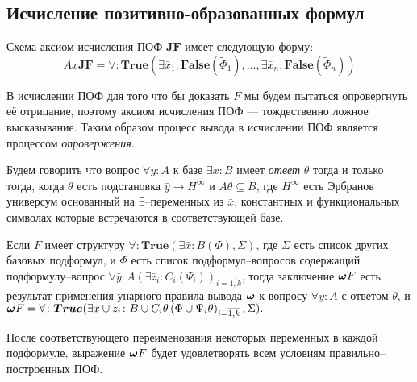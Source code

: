 \subsection{Исчисление позитивно-образованных формул}

Схема аксиом исчисления ПОФ $\boldsymbol{JF}$ имеет следующую форму:
$$ Ax\boldsymbol{JF} = \forall\colon\boldsymbol{True}\left(\exists \bar{x}_1\colon\boldsymbol{False}\left(\widetilde{\Phi}_1\right),\ldots,\exists \bar{x}_n\colon\boldsymbol{False}\left(\widetilde{\Phi}_n\right)\right) $$

В исчислении ПОФ для того что бы доказать $F$ мы будем пытаться опровергнуть её отрицание, поэтому аксиом исчисления ПОФ ---  тождественно ложное высказывание. Таким образом процесс вывода в исчислении ПОФ является процессом {\em опровержения}.

\begin{definition}
\label{ircond}
Будем говорить что вопрос $\forall \bar{y}\colon A$ к базе $\exists \bar{x}\colon B$ имеет {\em ответ} $\theta$  тогда и только тогда, когда $\theta$ есть подстановка $\bar{y} \rightarrow H^{\infty}$ и $A\theta \subseteq B$, где $H^{\infty}$ есть Эрбранов универсум основанный на $\exists$--переменных из $\bar{x}$, константных и функциональных символах которые встречаются в соответствующей базе.
\end{definition}


\begin{definition}
Если $F$ имеет структуру $\forall\colon\boldsymbol{True}\left(\exists \bar{x}\colon B\left(\Phi\right),\Sigma\right)$, где $\Sigma$ есть список других базовых подформул, и $\Phi$ есть список подформул--вопросов содержащий подформулу--вопрос $\forall \bar{y}\colon A(\exists \bar{z}_i\colon C_i\left(\Psi_i\right))_{i=\overline{1,k}}$, тогда заключение $\boldsymbol{\omega} F$ есть результат применения унарного правила вывода $\boldsymbol{\omega}$ к вопросу $\forall \bar{y}\colon A$ с ответом $\theta$, и $\boldsymbol{\omega} F = \forall\colon\boldsymbol{True}(\exists \bar{x} \cup \bar{z}_i\colon B \cup C_i\theta\left(\Phi \cup \Psi_i\theta\right)_{i=\overline{1,k}},\Sigma).$

\end{definition}

После соответствующего переименования некоторых переменных в каждой подформуле, выражение $\boldsymbol{\omega} F$ будет удовлетворять всем условиям правильно--построенных ПОФ.

